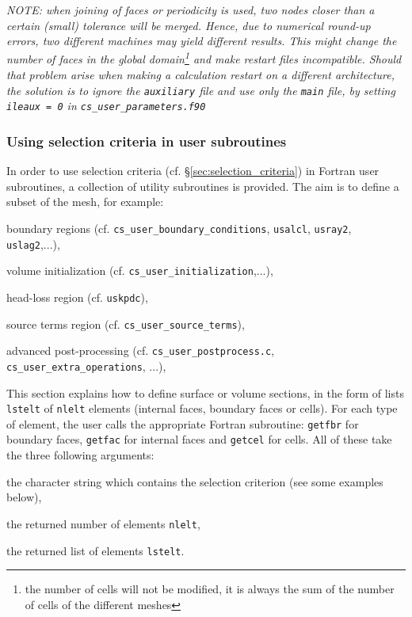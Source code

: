 {{{{\em NOTE: when joining of faces or periodicity is used, two nodes closer
than a certain (small) tolerance will be merged. Hence, due to numerical
round-up errors, two different machines may yield different results.
This might change the number of faces in the global
domain\footnote{the number of cells will not be modified, it is always the sum of the
number of cells of the different meshes} and make restart files
incompatible. Should that problem arise when making a calculation restart on a
different architecture, the solution is to ignore the \texttt{auxiliary}
file and use only the \texttt{main} file, by setting \texttt{ileaux = 0}
in \texttt{cs\_user\_parameters.f90}}

\subsubsection{Using selection criteria in user subroutines}
\label{sec:fvm_selector}

In order to use selection criteria (cf. \S\ref{sec:selection_criteria}) in Fortran
user subroutines, a collection of utility subroutines is provided. The aim is to
define a subset of the mesh, for example:

\begin{list}{-}{}
\item boundary regions (cf. \texttt{cs\_user\_boundary\_conditions}, \texttt{usalcl},
\texttt{usray2}, \texttt{uslag2},...),
\item volume initialization (cf. \texttt{cs\_user\_initialization},...),
\item head-loss region (cf. \texttt{uskpdc}),
\item source terms region (cf. \texttt{cs\_user\_source\_terms}),
\item advanced post-processing (cf. \texttt{cs\_user\_postprocess.c},
      \texttt{cs\_user\_extra\_operations}, ...),
\end{list}

This section explains how to define surface or volume sections,
in the form of lists \texttt{lstelt} of \texttt{nlelt} elements
(internal faces, boundary faces or cells).
For each type of element, the user calls the appropriate Fortran
subroutine: \texttt{getfbr}
for boundary faces, \texttt{getfac} for internal faces
and \texttt{getcel} for cells. All of these take
the three following arguments:
\begin{list}{-}{}
\item the character string which contains the selection
      criterion (see some examples below),
\item the returned number of elements \texttt{nlelt},
\item the returned list of elements \texttt{lstelt}.
\end{list}

}}}
